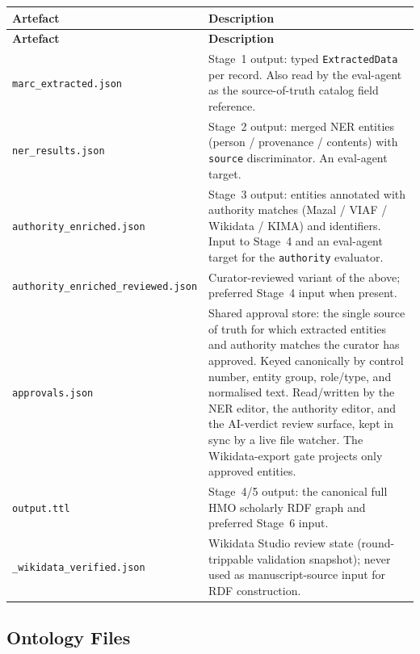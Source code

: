 \documentclass[12pt]{article}
\newcommand{\filepath}[1]{\texttt{\small #1}}
\newcommand{\code}[1]{\texttt{#1}}
\begin{document}
\begin{longtable}{|p{6cm}|p{8cm}|}
\hline
\textbf{Artefact} & \textbf{Description} \\
\hline
\endfirsthead
\hline
\textbf{Artefact} & \textbf{Description} \\
\hline
\endhead
\hline
\endfoot
\filepath{marc\_extracted.json} & Stage~1 output: typed \code{ExtractedData} per record. Also read by the eval-agent as the source-of-truth catalog field reference. \\
\hline
\filepath{ner\_results.json} & Stage~2 output: merged NER entities (person / provenance / contents) with \code{source} discriminator. An eval-agent target. \\
\hline
\filepath{authority\_enriched.json} & Stage~3 output: entities annotated with authority matches (Mazal / VIAF / Wikidata / KIMA) and identifiers. Input to Stage~4 and an eval-agent target for the \code{authority} evaluator. \\
\hline
\filepath{authority\_enriched\_reviewed.json} & Curator-reviewed variant of the above; preferred Stage~4 input when present. \\
\hline
\filepath{approvals.json} & Shared approval store: the single source of truth for which extracted entities and authority matches the curator has approved. Keyed canonically by control number, entity group, role/type, and normalised text. Read/written by the NER editor, the authority editor, and the AI-verdict review surface, kept in sync by a live file watcher. The Wikidata-export gate projects only approved entities. \\
\hline
\filepath{output.ttl} & Stage~4/5 output: the canonical full HMO scholarly RDF graph and preferred Stage~6 input. \\
\hline
\filepath{*\_wikidata\_verified.json} & Wikidata Studio review state (round-trippable validation snapshot); never used as manuscript-source input for RDF construction. \\
\hline
\end{longtable}

\subsection{Ontology Files}
\end{document}
